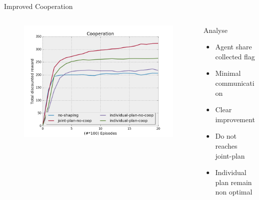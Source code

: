 \documentclass{bredelebeamer}
\begin{document}
\begin{frame}{Improved Cooperation}



\begin{columns}
\begin{column}{0.65\linewidth}


\begin{figure}[h!]
  \includegraphics[width=\linewidth]{../article/img/coop.png}
  \label{fig:results2}
\end{figure}

\end{column}

\begin{column}{0.45\linewidth}

\begin{block}{Analyse}
\begin{itemize}
\item Agent share collected flag
\item Minimal communication
\item Clear improvement
\item Do not reaches joint-plan
\item Individual plan remain non optimal
\end{itemize}
\end{block}
\end{column}

\end{columns}

\end{frame}
\end{document}
